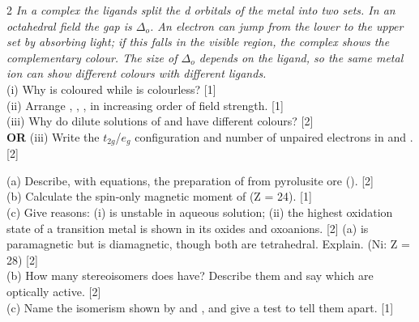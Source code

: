 \documentclass[10pt,a4paper]{extarticle}
\newcommand{\mk}[1]{{\scriptsize\color{black!55}[#1]}}
\begin{document}
\begin{multicols}{2}
\Q \textit{In a complex the ligands split the d orbitals of the metal into two sets. In an octahedral field the gap is $\Delta_o$. An electron can jump from the lower to the upper set by absorbing light; if this falls in the visible region, the complex shows the complementary colour. The size of $\Delta_o$ depends on the ligand, so the same metal ion can show different colours with different ligands.}\\[2pt]
(i) Why is  coloured while  is colourless? \mk{1}\\
(ii) Arrange , , ,  in increasing order of field strength. \mk{1}\\
(iii) Why do dilute solutions of  and  have different colours? \mk{2}\\
\textbf{OR} (iii) Write the $t_{2g}$/$e_g$ configuration and number of unpaired electrons in  and . \mk{2}

\Q (a) Describe, with equations, the preparation of  from pyrolusite ore (). \mk{2}\\
(b) Calculate the spin-only magnetic moment of  (Z = 24). \mk{1}\\
(c) Give reasons: (i)  is unstable in aqueous solution; (ii) the highest oxidation state of a transition metal is shown in its oxides and oxoanions. \mk{2}
\Q (a)  is paramagnetic but \ce{[Ni(CO)4]} is diamagnetic, though both are tetrahedral. Explain. (Ni: Z = 28) \mk{2}\\
(b) How many stereoisomers does \ce{[CoCl2(en)2]+} have? Describe them and say which are optically active. \mk{2}\\
(c) Name the isomerism shown by  and , and give a test to tell them apart. \mk{1}
\end{multicols}
\end{document}
